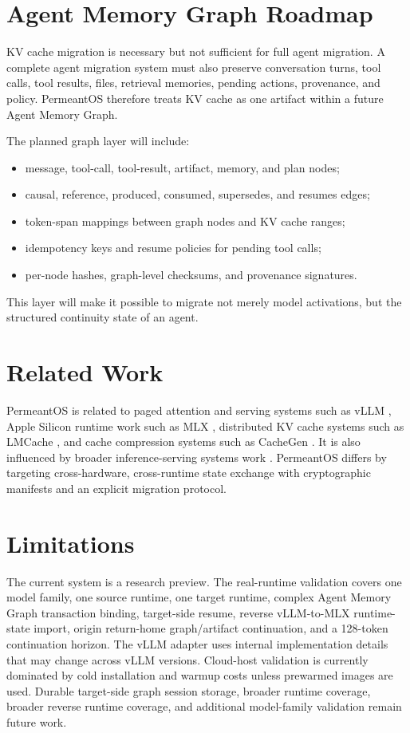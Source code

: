 \documentclass[11pt]{article}
\begin{document}
\section{Agent Memory Graph Roadmap}

KV cache migration is necessary but not sufficient for full agent migration. A complete agent migration system must also preserve conversation turns, tool calls, tool results, files, retrieval memories, pending actions, provenance, and policy. PermeantOS therefore treats KV cache as one artifact within a future Agent Memory Graph.

The planned graph layer will include:
\begin{itemize}[leftmargin=*]
  \item message, tool-call, tool-result, artifact, memory, and plan nodes;
  \item causal, reference, produced, consumed, supersedes, and resumes edges;
  \item token-span mappings between graph nodes and KV cache ranges;
  \item idempotency keys and resume policies for pending tool calls;
  \item per-node hashes, graph-level checksums, and provenance signatures.
\end{itemize}

This layer will make it possible to migrate not merely model activations, but the structured continuity state of an agent.

\section{Related Work}

PermeantOS is related to paged attention and serving systems such as vLLM \cite{kwon2023pagedattention,vllm2023}, Apple Silicon runtime work such as MLX \cite{mlx2023}, distributed KV cache systems such as LMCache \cite{lmcache2024}, and cache compression systems such as CacheGen \cite{liu2024cachegen}. It is also influenced by broader inference-serving systems work \cite{zheng2024lmsys}. PermeantOS differs by targeting cross-hardware, cross-runtime state exchange with cryptographic manifests and an explicit migration protocol.

\section{Limitations}

The current system is a research preview. The real-runtime validation covers one model family, one source runtime, one target runtime, complex Agent Memory Graph transaction binding, target-side resume, reverse vLLM-to-MLX runtime-state import, origin return-home graph/artifact continuation, and a 128-token continuation horizon. The vLLM adapter uses internal implementation details that may change across vLLM versions. Cloud-host validation is currently dominated by cold installation and warmup costs unless prewarmed images are used. Durable target-side graph session storage, broader runtime coverage, broader reverse runtime coverage, and additional model-family validation remain future work.
\end{document}
